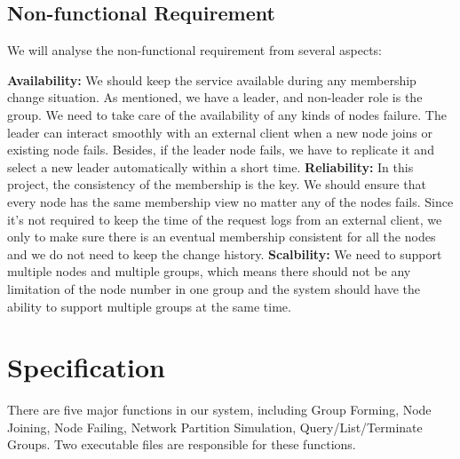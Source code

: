 \documentclass[a4paper,11pt]{article}
\begin{document}
\subsection{Non-functional Requirement}
We will analyse the non-functional requirement from several aspects:
\begin{outline}
\1 \textbf{Availability:} We should keep the service available during any membership change situation. As mentioned, we have a leader, and non-leader role is the group. We need to take care of the availability of any kinds of nodes failure. The leader can interact smoothly with an external client when a new node joins or existing node fails. Besides, if the leader node fails, we have to replicate it and select a new leader automatically within a short time.
\1 \textbf{Reliability:} In this project, the consistency of the membership is the key. We should ensure that every node has the same membership view no matter any of the nodes fails. Since it's not required to keep the time of the request logs from an external client, we only to make sure there is an eventual membership consistent for all the nodes and we do not need to keep the change history.
\1 \textbf{Scalbility:} We need to support multiple nodes and multiple groups, which means there should not be any limitation of the node number in one group and the system should have the ability to support multiple groups at the same time.
\end{outline}


\section{Specification}
There are five major functions in our system, including Group Forming, Node Joining, Node Failing, Network Partition Simulation, Query/List/Terminate Groups. Two executable files are responsible for these functions.
\end{document}
